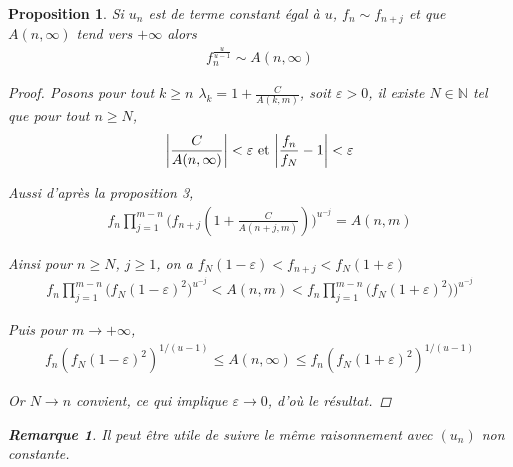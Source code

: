 \documentclass{article}
\newtheorem{prop}{Proposition}
\newtheorem*{remark}{Remarque}
\begin{document}
\begin{prop}
Si $u_n$ est de terme constant égal à $u$, $f_n\sim f_{n+j}$ et que $A(n,\infty)$ tend vers $+\infty$ alors
\begin{align*}
f_n^{\frac{u}{u-1}}\sim A(n,\infty)
\end{align*}
\begin{proof}
Posons pour tout $k\geq n$ $\lambda_k = 1+\frac{C}{A(k,m)}$, soit $\varepsilon >0$, il existe $N\in\mathbb{N}$ tel que pour tout $n\geq N$, 
\begin{align*}
\bigg|\frac{C}{A(n,\infty)}\bigg|< \varepsilon \textup{ et } \bigg|\frac{f_n}{f_N}-1\bigg|< \varepsilon
\end{align*}

Aussi d'après la proposition 3,
\begin{align*}
f_n\prod_{j=1}^{m-n}{\bigg( f_{n+j}(1+\frac{C}{A(n+j,m)})\bigg)^{u^{-j}}}=A(n,m)
\end{align*}

Ainsi pour $n\geq N$, $j\geq 1$, on a $f_N(1-\varepsilon)<f_{n+j} <f_N(1+\varepsilon)$
\begin{align*}
f_n\prod_{j=1}^{m-n}\bigg(f_N(1-\varepsilon)^2\bigg)^{u^{-j}}< A(n,m) < f_n\prod_{j=1}^{m-n}\bigg(f_N(1+\varepsilon)^2)\bigg)^{u^{-j}}
\end{align*}

Puis pour $m\to +\infty$,
\begin{align*}
f_n(f_N(1-\varepsilon)^2)^{1/(u-1)}\leq  A(n,\infty) \leq f_n(f_N (1+\varepsilon)^2)^{1/(u-1)} 
\end{align*} 

Or $N\to n$ convient, ce qui implique $\varepsilon\to 0$, d'où le résultat.
\end{proof}
\begin{remark}
Il peut être utile de suivre le même raisonnement avec $(u_n)$ non constante.
\end{remark}
\end{prop}
\end{document}
